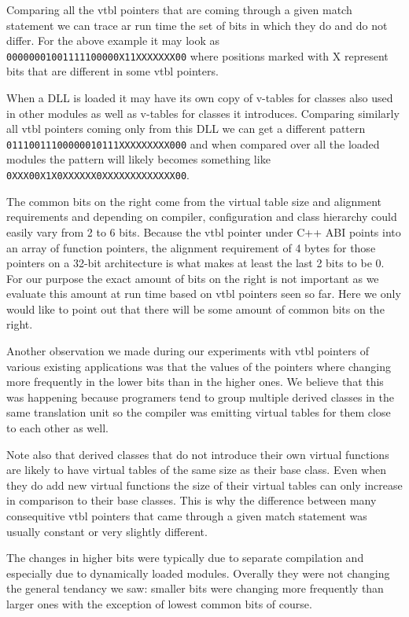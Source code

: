 \documentclass[preprint]{sigplanconf}
\begin{document}
Comparing all the vtbl pointers that are coming through a given match statement 
we can trace ar run time the set of bits in which they do and do not differ. 
For the above example it may look as \texttt{00000001001111100000X11XXXXXXX00} 
where positions marked with X represent bits that are different in some vtbl 
pointers.

When a DLL is loaded it may have its own copy of v-tables for classes also used 
in other modules as well as v-tables for classes it introduces. Comparing 
similarly all vtbl pointers coming only from this DLL we can get a different 
pattern \\ \texttt{01110011100000010111XXXXXXXXX000} and when compared over all 
the loaded modules the pattern will likely becomes something like 
\texttt{0XXX00X1X0XXXXXX0XXXXXXXXXXXXX00}.

The common bits on the right come from the virtual table size and alignment 
requirements and depending on compiler, configuration and class hierarchy could 
easily vary from 2 to 6 bits. Because the vtbl pointer under C++ ABI points into 
an array of function pointers, the alignment requirement of 4 bytes for those 
pointers on a 32-bit architecture is what makes at least the last 2 bits to be 0. 
For our purpose the exact amount of bits on the right is not important as we 
evaluate this amount at run time based on vtbl pointers seen so far. Here we only 
would like to point out that there will be some amount of common bits on the 
right.

Another observation we made during our experiments with vtbl pointers of various 
existing applications was that the values of the pointers where changing more 
frequently in the lower bits than in the higher ones. We believe that this was 
happening because programers tend to group multiple derived classes in the same 
translation unit so the compiler was emitting virtual tables for them close to 
each other as well. 

Note also that derived classes that do not introduce their own virtual functions 
are likely to have virtual tables of the same size as their base class. Even 
when they do add new virtual functions the size of their virtual tables can only 
increase in comparison to their base classes. This is why the difference between 
many consequitive vtbl pointers that came through a given match statement was 
usually constant or very slightly different.

The changes in higher bits were typically due to separate compilation and 
especially due to dynamically loaded modules. Overally they were not changing 
the general tendancy we saw: smaller bits were changing more frequently than 
larger ones with the exception of lowest common bits of course.
\end{document}
